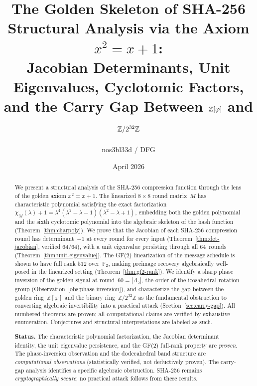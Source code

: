 \documentclass[12pt, a4paper]{article}
\title{%
  The Golden Skeleton of SHA-256\\[4pt]
  \large Structural Analysis via the Axiom $x^{2}=x+1$:\\
  Jacobian Determinants, Unit Eigenvalues, Cyclotomic Factors,\\
  and the Carry Gap Between $\Zphi$ and $\Z/2^{32}\Z$%
}
\author{%
  nos3bl33d / DFG%
}
\date{April 2026}
\theoremstyle{plain}
\theoremstyle{definition}
\newcommand{\Z}{\mathbb{Z}}
\newcommand{\F}{\mathbb{F}}
\newcommand{\vp}{\varphi}
\newcommand{\Zphi}{\Z[\vp]}
\newcommand{\charpoly}{\chi_M}
\begin{document}
\maketitle

\begin{abstract}
We present a structural analysis of the SHA-256 compression function
through the lens of the golden axiom $x^{2}=x+1$.
The linearized $8\times 8$ round matrix~$M$ has characteristic polynomial
satisfying the exact factorization
$\charpoly(\lambda)+1=\lambda^{4}(\lambda^{2}-\lambda-1)(\lambda^{2}-\lambda+1)$,
embedding both the golden polynomial and the sixth cyclotomic polynomial
into the algebraic skeleton of the hash function
(Theorem~\ref{thm:charpoly}).
We prove that the Jacobian of each SHA-256 compression round has
determinant~$-1$ at every round for every input
(Theorem~\ref{thm:det-jacobian}, verified 64/64),
with a unit eigenvalue persisting through all 64~rounds
(Theorem~\ref{thm:unit-eigenvalue}).
The GF(2) linearization of the message schedule is shown to have full
rank $512$ over~$\F_{2}$, making preimage recovery algebraically
well-posed in the linearized setting
(Theorem~\ref{thm:gf2-rank}).
We identify a sharp phase inversion of the golden signal at round~$60=|A_{5}|$,
the order of the icosahedral rotation group
(Observation~\ref{obs:phase-inversion}),
and characterize the gap between the golden ring~$\Zphi$ and the
binary ring~$\Z/2^{32}\Z$ as the fundamental obstruction to
converting algebraic invertibility into a practical attack
(Section~\ref{sec:carry-gap}).
All numbered theorems are proven; all computational claims are
verified by exhaustive enumeration.
Conjectures and structural interpretations are labeled as such.

\medskip\noindent
\textbf{Status.}
The characteristic polynomial factorization, the Jacobian
determinant identity, the unit eigenvalue persistence, and the
GF(2) full-rank property are \emph{proven}.
The phase-inversion observation and the dodecahedral band
structure are \emph{computational observations} (statistically
verified, not deductively proven).
The carry-gap analysis identifies a specific algebraic
obstruction.
SHA-256 remains \emph{cryptographically secure}; no practical
attack follows from these results.
\end{abstract}

\tableofcontents
\newpage

\end{document}
